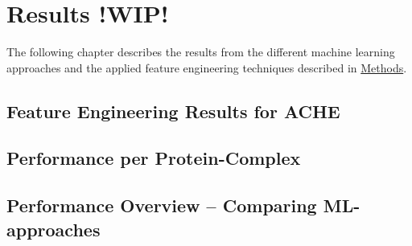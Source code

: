 \chapter{Results !WIP!}
\label{cha:Results}
The following chapter describes the results from the different machine learning approaches and the applied 
feature engineering techniques described in \href{cha:Methods}{Methods}.
\section{Feature Engineering Results for ACHE}

\section{Performance per Protein-Complex}


\section{Performance Overview -- Comparing ML-approaches}
